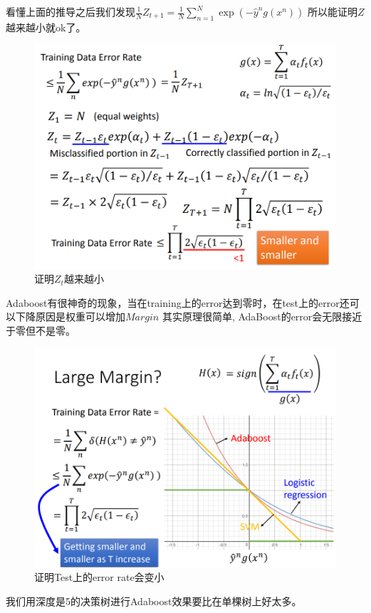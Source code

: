看懂上面的推导之后我们发现$\frac{1}{N} Z_{t+1} = \frac{1}{N} \sum_{n=1}^N  \exp(-\hat{y}^n g(x^n))$
所以能证明$Z$越来越小就ok了。

\begin{figure}[H]
    \centerline{\includegraphics[scale=0.5]{Part1/Chapter/images/proofzt.png}}
    \caption{证明$Z_t$越来越小}
\end{figure}

Adaboost有很神奇的现象，当在training上的error达到零时，在test上的error还可以下降原因是权重可以增加$Margin$
其实原理很简单, AdaBoost的error会无限接近于零但不是零。
\begin{figure}[H]
    \centerline{\includegraphics[scale=0.5]{Part1/Chapter/images/largemargin.png}}
    \caption{证明Test上的error rate会变小}
\end{figure}
我们用深度是5的决策树进行Adaboost效果要比在单棵树上好太多。

